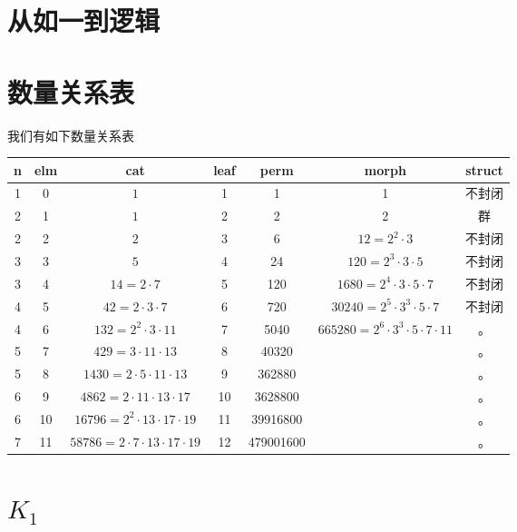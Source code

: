 \documentclass[a4paper,12pt]{article}
\numberwithin{definition}{section}
\numberwithin{lemma}{section}
\numberwithin{proposition}{section}
\numberwithin{theorem}{section}
\numberwithin{grammar}{section}
\numberwithin{program}{section}
\numberwithin{convention}{section}
\numberwithin{corollary}{section}
\numberwithin{principle}{section}
\begin{document}
\section{从如一到逻辑}



\newpage

\appendix
\newpage

\section{数量关系表}

我们有如下数量关系表

\begin{table}[]
\begin{tabular}{|c|c|c|c|c|c|c|}
\hline
 n & elm &  cat     & leaf & perm & morph & struct \\ \hline
   1 &  0  &    $1$     &  1   &  1 & 1 & 不封闭   \\ \hline
   2 &  1  &    $1$     &  2   &  2 & 2 & 群 \\ \hline
   2 &  2  &    $2$     &  3   &  6 & $12 = 2^2 \cdot 3$ & 不封闭 \\ \hline
   3 &  3  &    $5$     &  4   &  24 & $120 = 2^3 \cdot 3 \cdot 5$ & 不封闭 \\ \hline
   3 &  4  &   $14 = 2 \cdot 7$ &  5   &  120 & $1680 = 2^4 \cdot 3 \cdot 5 \cdot 7$ & 不封闭  \\ \hline
   4 &  5  &   $42 = 2 \cdot 3 \cdot 7$ &  6   &  720 & $30240 = 2^5 \cdot 3^3 \cdot 5 \cdot 7 $ & 不封闭 \\ \hline
   4 &  6  &  $132 = 2^2 \cdot 3 \cdot 11$ &  7   &  5040 & $665280 = 2^6 \cdot 3^3 \cdot 5 \cdot 7 \cdot 11 $ & 。   \\ \hline
   5 &  7  &  $429 = 3 \cdot 11 \cdot 13$ &  8   &  40320 & & 。   \\ \hline
   5 &  8  & $1430 = 2 \cdot 5 \cdot 11 \cdot 13$ &  9   &  362880 & & 。   \\ \hline
   6 &  9  & $4862 = 2 \cdot 11 \cdot 13 \cdot 17$ &  10  & 3628800 & & 。   \\ \hline
   6 & 10  &$16796 = 2^2 \cdot 13 \cdot 17 \cdot 19$ &  11  & 39916800 & & 。   \\ \hline
   7 & 11  &$58786 = 2 \cdot 7 \cdot 13 \cdot 17 \cdot 19$ &  12  & 479001600 & & 。   \\ \hline
\end{tabular}
\end{table}

\section{$K_1$}
\end{document}
